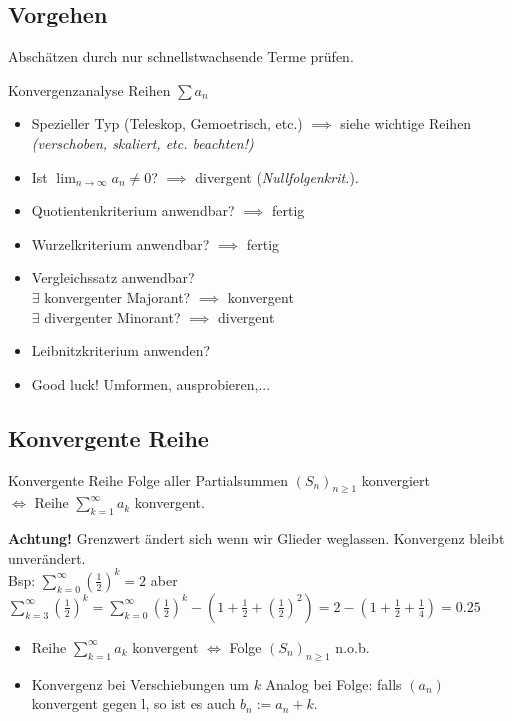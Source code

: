 \documentclass[a4paper]{article}
\begin{document}
\subsection{Vorgehen}
Abschätzen durch nur schnellstwachsende Terme prüfen.
\begin{howtobox}{Konvergenzanalyse Reihen $\sum a_n$}
  \begin{itemize}[leftmargin=3mm, topsep=1pt, parsep=1pt]
    \item[1.] Spezieller Typ (Teleskop, Gemoetrisch, etc.) $\implies$ siehe wichtige Reihen \textit{(verschoben, skaliert, etc. beachten!)}
    \item[2.] Ist $\lim_{n \rightarrow \infty} a_n \neq 0$? $\implies$ divergent (\textit{Nullfolgenkrit.}).
    \item[3.] Quotientenkriterium anwendbar? $\implies$ fertig 
    \item[4.] Wurzelkriterium anwendbar? $\implies$ fertig
    \item[5]  Vergleichssatz anwendbar? \\ 
            $\exists$ konvergenter Majorant? $\implies$ konvergent \\
            $\exists$ divergenter Minorant? $\implies$ divergent
    \item[6.] Leibnitzkriterium anwenden?
    \item[7.] Good luck! Umformen, ausprobieren,... 
  \end{itemize}
\end{howtobox}


\subsection{Konvergente Reihe}
\begin{mainbox}{Konvergente Reihe}
    Folge aller Partialsummen $(S_n)_{n \geqslant 1}$ konvergiert \\
    $\iff$ Reihe $\sum_{k = 1}^{\infty} a_k$ konvergent.
  \end{mainbox}
  \textbf{Achtung!} Grenzwert ändert sich wenn wir Glieder weglassen. Konvergenz bleibt unverändert. \\ 
  \tiny \color{gray}
    Bsp: $\sum_{k = 0}^{\infty}(\frac{1}{2})^k = 2$ aber $\sum_{k = 3}^{\infty}(\frac{1}{2})^k = \sum_{k = 0}^{\infty}(\frac{1}{2})^k - (1 + \frac{1}{2} + (\frac{1}{2})^2) = 2 - (1 + \frac{1}{2} + \frac{1}{4}) = 0.25$   
  \normalsize \color{black}
  
\begin{itemize}[leftmargin=4.5mm, topsep=1pt, parsep=1pt]
  \item Reihe $\sum_{k = 1}^{\infty} a_k$ konvergent $\Leftrightarrow$ Folge $(S_n)_{n \geqslant 1}$ n.o.b. \\
  \item Konvergenz bei Verschiebungen um $k$ Analog bei Folge: falls $(a_n)$ konvergent gegen l, so ist es auch $b_n := a_n+k$. \\
\end{itemize}
\end{document}
